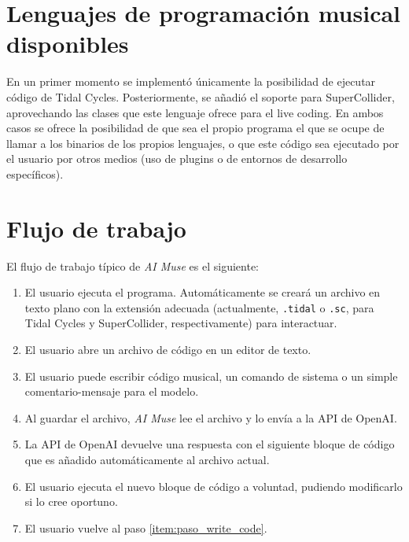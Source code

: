 
\section{Lenguajes de programación musical disponibles}

En un primer momento se implementó únicamente la posibilidad de ejecutar código de Tidal Cycles. Posteriormente, se añadió el soporte para SuperCollider, aprovechando las clases que este lenguaje ofrece para el live coding. En ambos casos se ofrece la posibilidad de que sea el propio programa el que se ocupe de llamar a los binarios de los propios lenguajes, o que este código sea ejecutado por el usuario por otros medios (uso de plugins o de entornos de desarrollo específicos).


\section{Flujo de trabajo}

El flujo de trabajo típico de \emph{AI Muse} es el siguiente:

\begin{enumerate}
    \item El usuario ejecuta el programa. Automáticamente se creará un archivo en texto plano con la extensión adecuada (actualmente, \texttt{.tidal} o \texttt{.sc}, para Tidal Cycles y SuperCollider, respectivamente) para interactuar.
    \item El usuario abre un archivo de código en un editor de texto.
    \item \label{item:paso_write_code} El usuario puede escribir código musical, un comando de sistema o un simple comentario-mensaje para el modelo.
    \item Al guardar el archivo, \emph{AI Muse} lee el archivo y lo envía a la API de OpenAI.
    \item La API de OpenAI devuelve una respuesta con el siguiente bloque de código que es añadido automáticamente al archivo actual.
    \item El usuario ejecuta el nuevo bloque de código a voluntad, pudiendo modificarlo si lo cree oportuno.
    \item El usuario vuelve al paso \ref{item:paso_write_code}.
\end{enumerate}

